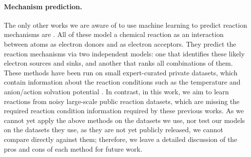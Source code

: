 \paragraph{Mechanism prediction.}
The only other works we are aware of to use machine learning to predict reaction mechanisms are \citet{fooshee2018deep,NIPS2011_4356,kayala2012reactionpredictor,kayala2011learning}. All of these model a chemical reaction as an interaction between atoms as electron donors and as electron acceptors. They predict the reaction mechanisms via two independent models: one that identifies these likely electron sources and sinks, and another that ranks all combinations of them.
These methods have been run on small expert-curated private datasets, which contain information about the reaction conditions such as the temperature and anion/action solvation potential \citep[\S2]{NIPS2011_4356}.
In contrast, in this work, we aim to learn reactions from noisy large-scale public reaction datasets, which are missing the required reaction condition information required by these previous works.
As we cannot yet apply the above methods on the datasets we use, nor test our models on the datasets they use, as they are not yet publicly released, we cannot compare directly against them; therefore, we leave a detailed discussion of the pros and cons of each method for future work.


